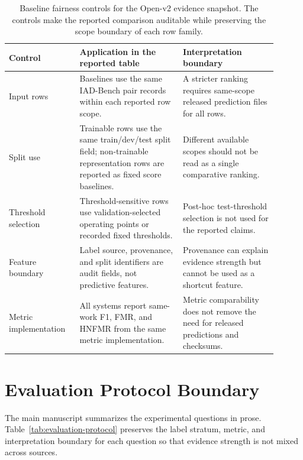 \documentclass[11pt]{article}
\begin{document}
\begin{table}[H]
\caption{Baseline fairness controls for the Open-v2 evidence snapshot. The controls make the reported comparison auditable while preserving the scope boundary of each row family.}
\label{tab:baseline-fairness-controls}
\centering
\footnotesize
\setlength{\tabcolsep}{3pt}
\begin{tabular}{L{0.23\linewidth}L{0.35\linewidth}L{0.32\linewidth}}
\toprule
Control & Application in the reported table & Interpretation boundary \\
\midrule
Input rows & Baselines use the same IAD-Bench pair records within each reported row scope. & A stricter ranking requires same-scope released prediction files for all rows. \\
Split use & Trainable rows use the same train/dev/test split field; non-trainable representation rows are reported as fixed score baselines. & Different available scopes should not be read as a single comparative ranking. \\
Threshold selection & Threshold-sensitive rows use validation-selected operating points or recorded fixed thresholds. & Post-hoc test-threshold selection is not used for the reported claims. \\
Feature boundary & Label source, provenance, and split identifiers are audit fields, not predictive features. & Provenance can explain evidence strength but cannot be used as a shortcut feature. \\
Metric implementation & All systems report same-work F1, FMR, and HNFMR from the same metric implementation. & Metric comparability does not remove the need for released predictions and checksums. \\
\bottomrule
\end{tabular}
\end{table}

\section{Evaluation Protocol Boundary}

The main manuscript summarizes the experimental questions in prose. Table~\ref{tab:evaluation-protocol} preserves the label stratum, metric, and interpretation boundary for each question so that evidence strength is not mixed across sources.
\end{document}
